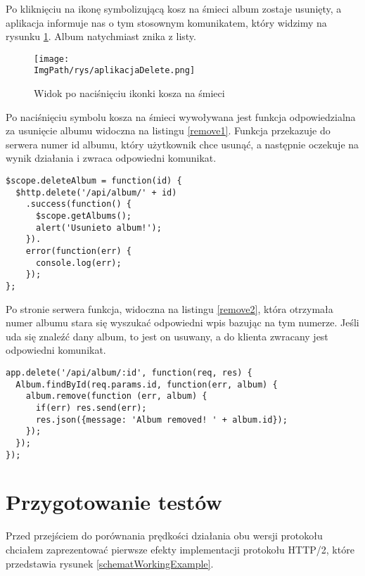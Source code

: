 \documentclass[a4paper,12pt,twoside,openany]{report}
\newcommand{\ImgPath}{.}
\begin{document}
Po kliknięciu na ikonę symbolizującą kosz na śmieci album zostaje usunięty, a aplikacja informuje nas o tym stosownym komunikatem, który widzimy na rysunku \ref{aplikacjaDelete}.
Album natychmiast znika z listy.

\begin{figure}[!htbp]
	\begin{center}
\centering
\texttt{[image: \\ImgPath/rys/aplikacjaDelete.png]}
\end{center}
	\caption{Widok po naciśnięciu ikonki kosza na śmieci}
	\label{aplikacjaDelete}
\end{figure}

Po naciśnięciu symbolu kosza na śmieci wywoływana jest funkcja odpowiedzialna za usunięcie albumu widoczna na listingu \ref{remove1}. Funkcja przekazuje do serwera numer id albumu, który użytkownik chce usunąć, a następnie oczekuje na wynik działania i zwraca odpowiedni komunikat.

\begin{lstlisting}[caption=Kod odpowiedzialny za przekazania id usuwanego albumu do serwera, label=remove1]
$scope.deleteAlbum = function(id) {
  $http.delete('/api/album/' + id)
    .success(function() {
      $scope.getAlbums();
      alert('Usunieto album!');
    }).
    error(function(err) {
      console.log(err);
    });
};
\end{lstlisting}

Po stronie serwera funkcja, widoczna na listingu \ref{remove2}, która otrzymała numer albumu stara się wyszukać odpowiedni wpis bazując na tym numerze. Jeśli uda się znaleźć dany album, to jest on usuwany, a do klienta zwracany jest odpowiedni komunikat.
\begin{lstlisting}[caption=Kod odpowiedzialny za usunięcie albumu o wybranym id z bazy, label=remove2]
app.delete('/api/album/:id', function(req, res) {
  Album.findById(req.params.id, function(err, album) {
    album.remove(function (err, album) {
      if(err) res.send(err);
      res.json({message: 'Album removed! ' + album.id});
    });
  });
});
\end{lstlisting}
\section{Przygotowanie testów}

Przed przejściem do porównania prędkości działania obu wersji protokołu chciałem zaprezentować pierwsze efekty implementacji protokołu HTTP/2, które przedstawia rysunek \ref{schematWorkingExample}.
\end{document}
